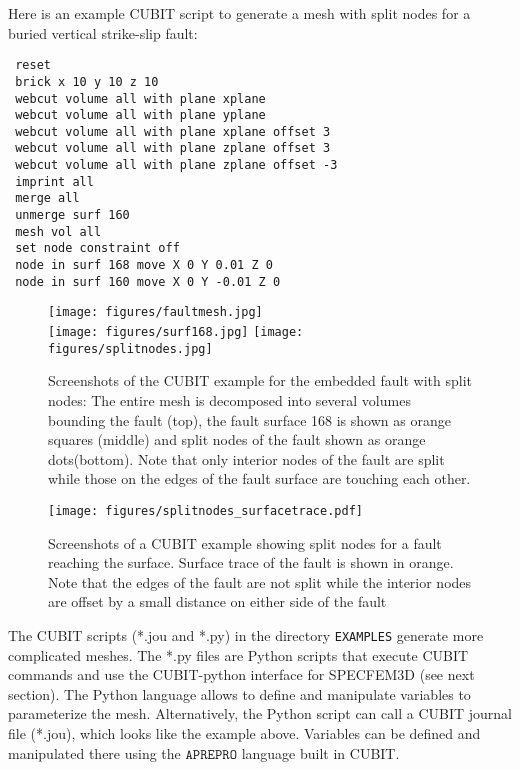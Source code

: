 \noindent
Here is an example CUBIT script to generate a mesh with split nodes
for a buried vertical strike-slip fault:

{\footnotesize
\begin{verbatim}
 reset
 brick x 10 y 10 z 10
 webcut volume all with plane xplane
 webcut volume all with plane yplane
 webcut volume all with plane xplane offset 3
 webcut volume all with plane zplane offset 3
 webcut volume all with plane zplane offset -3
 imprint all
 merge all
 unmerge surf 160
 mesh vol all
 set node constraint off
 node in surf 168 move X 0 Y 0.01 Z 0
 node in surf 160 move X 0 Y -0.01 Z 0
\end{verbatim}
}

\begin{figure}[htbp]
\begin{centering}
\texttt{[image: figures/faultmesh.jpg]} \\
\texttt{[image: figures/surf168.jpg]}
\texttt{[image: figures/splitnodes.jpg]}
\par
\end{centering}
\caption{Screenshots of the CUBIT example for the embedded fault with split
nodes: The entire mesh is decomposed into several volumes bounding
the fault (top), the fault surface 168 is shown as orange squares
(middle) and split nodes of the fault shown as orange dots(bottom).
Note that only interior nodes of the fault are split while those on
the edges of the fault surface are touching each other.}
\label{fig:examples.splitnodes}
\end{figure}

\begin{figure}[htbp]
\begin{centering}
\texttt{[image: figures/splitnodes\_surfacetrace.pdf]}
\par
\end{centering}
\caption{Screenshots of a CUBIT example showing split nodes for a fault reaching
the surface. Surface trace of the fault is shown in orange. Note that
the edges of the fault are not split while the interior nodes are
offset by a small distance on either side of the fault}
\label{fig:examples.splitnodes-surfacetrace}
\end{figure}

\noindent
The CUBIT scripts ({*}.jou and {*}.py) in the directory \texttt{EXAMPLES}
generate more complicated meshes. The {*}.py files are Python scripts
that execute CUBIT commands and use the CUBIT-python interface for
SPECFEM3D (see next section). The Python language allows to define
and manipulate variables to parameterize the mesh. Alternatively,
the Python script can call a CUBIT journal file ({*}.jou), which looks
like the example above. Variables can be defined and manipulated there
using the $\mathtt{APREPRO}$ language built in CUBIT.\\

